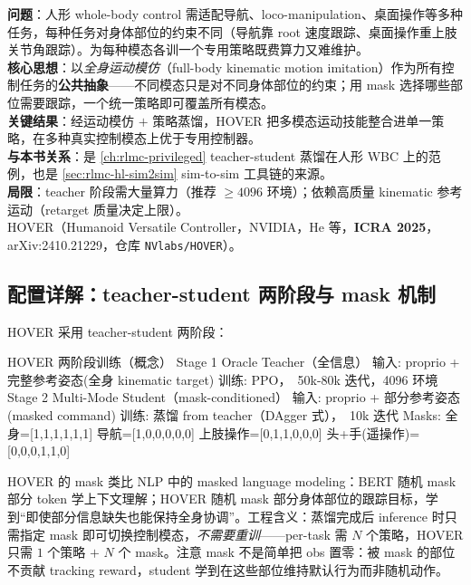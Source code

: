 \begin{paper}\label{paper:rlmc-hl-hover}
\textbf{问题}：人形 whole-body control 需适配导航、loco-manipulation、桌面操作等多种任务，每种任务对身体部位的约束不同（导航靠 root 速度跟踪、桌面操作重上肢关节角跟踪）。为每种模态各训一个专用策略既费算力又难维护。\\
\textbf{核心思想}：以\emph{全身运动模仿}（full-body kinematic motion imitation）作为所有控制任务的\textbf{公共抽象}——不同模态只是对不同身体部位的约束；用 mask 选择哪些部位需要跟踪，一个统一策略即可覆盖所有模态。\\
\textbf{关键结果}：经运动模仿 $+$ 策略蒸馏，HOVER 把多模态运动技能整合进单一策略，在多种真实控制模态上优于专用控制器。\\
\textbf{与本书关系}：是 \cref{ch:rlmc-privileged} teacher-student 蒸馏在人形 WBC 上的范例，也是 \cref{sec:rlmc-hl-sim2sim} sim-to-sim 工具链的来源。\\
\textbf{局限}：teacher 阶段需大量算力（推荐 $\geq 4096$ 环境）；依赖高质量 kinematic 参考运动（retarget 质量决定上限）。\\
HOVER（Humanoid Versatile Controller，NVIDIA，He 等，\textbf{ICRA 2025}，arXiv:2410.21229，仓库 \texttt{NVlabs/HOVER}）\cite{he2025hover}。
\end{paper}

\subsection{配置详解：teacher-student 两阶段与 mask 机制}
HOVER 采用 teacher-student 两阶段：

\begin{codebox}[text]{HOVER 两阶段训练（概念）}
Stage 1  Oracle Teacher（全信息）
  输入: proprio + 完整参考姿态(全身 kinematic target)
  训练: PPO，~50k-80k 迭代，4096 环境
Stage 2  Multi-Mode Student（mask-conditioned）
  输入: proprio + 部分参考姿态(masked command)
  训练: 蒸馏 from teacher（DAgger 式），~10k 迭代
  Masks: 全身=[1,1,1,1,1,1] 导航=[1,0,0,0,0,0]
         上肢操作=[0,1,1,0,0,0] 头+手(遥操作)=[0,0,0,1,1,0]
\end{codebox}

\begin{insight}\label{ins:rlmc-hl-mask}
HOVER 的 mask 类比 NLP 中的 masked language modeling：BERT 随机 mask 部分 token 学上下文理解；HOVER 随机 mask 部分身体部位的跟踪目标，学到“即使部分信息缺失也能保持全身协调”。工程含义：蒸馏完成后 inference 时只需指定 mask 即可切换控制模态，\emph{不需要重训}——per-task 需 $N$ 个策略，HOVER 只需 $1$ 个策略 $+$ $N$ 个 mask。注意 mask 不是简单把 obs 置零：被 mask 的部位不贡献 tracking reward，student 学到在这些部位维持默认行为而非随机动作。
\end{insight}

